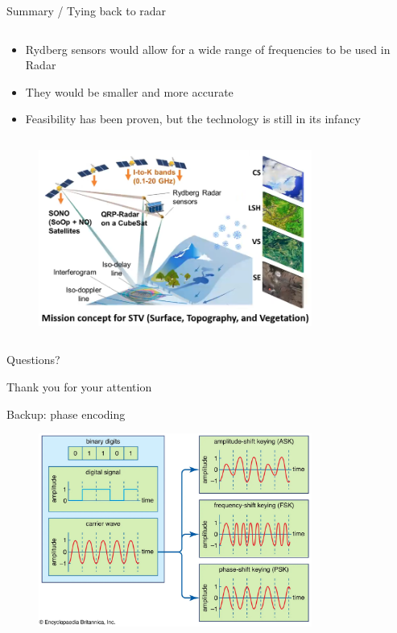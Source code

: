 \begin{columnframe}{Summary / Tying back to radar}
    \begin{column}{0.5\textwidth}
        \begin{itemize}
            \item Rydberg sensors would allow for a wide range of frequencies to be used in Radar
            \item They would be smaller and more accurate
            \item Feasibility has been proven, but the technology is still in its infancy
        \end{itemize}
    \end{column}
    \begin{column}{0.5\textwidth}
        \begin{figure}
            \centering
            \includegraphics[width=0.8\textwidth]{images/rydberg_radar_nasa.png}
        \end{figure}

    \end{column}
\end{columnframe}

\begin{frame}{}
    \centering
    \Large{Questions?}
\end{frame}

\begin{frame}{}
    \centering
    \Large{Thank you for your attention}
\end{frame}

\begin{frame}{Backup: phase encoding}
    \begin{figure}
        \centering
        \includegraphics[width=0.8\textwidth]{images/britanicca_phase_encoding.png}
    \end{figure}
\end{frame}

